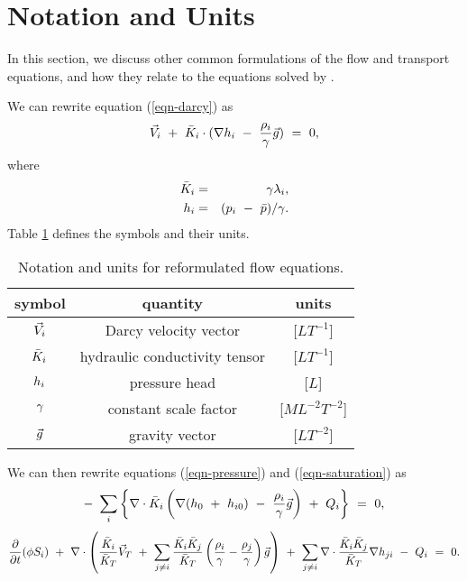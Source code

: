 \section{Notation and Units}
\label{Notation and Units}

In this section, we discuss other common formulations of the flow
and transport equations, and how they relate to the equations solved
by \parflow{}.

We can rewrite equation (\ref{eqn-darcy}) as
\begin{equation} \label{eqn-darcy-b}
{\vec V}_i ~+~ {\bar K}_i \cdot ( \nabla h_i ~-~ \frac{\rho_i}{\gamma} {\vec g} ) ~=~ 0 ,
\end{equation}
where
\begin{eqnarray} \label{eqn-cond-phead}
{\bar K}_i & = & \gamma {\lambda}_i , \\
h_i & = & ( p_i ~-~ \bar{p} ) / \gamma .
\end{eqnarray}
Table \ref{table-flow-units-b} defines the symbols and their units.
\begin{table} \center
\caption{Notation and units for reformulated flow equations.}
\smallskip
\begin{tabular}{||c||c|c||}
\hline
symbol & quantity & units \\
\hline\hline
${\vec V}_i$      & Darcy velocity vector         & [$L T^{-1}$]        \\ \hline
${\bar K}_i$      & hydraulic conductivity tensor & [$L T^{-1}$]        \\ \hline
$h_i$      & pressure head                 & [$L$]               \\ \hline
$\gamma$   & constant scale factor         & [$M L^{-2} T^{-2}$] \\ \hline
${\vec g}$       & gravity vector                & [$L T^{-2}$]        \\ \hline
\end{tabular}
\label{table-flow-units-b}
\end{table}
We can then rewrite equations (\ref{eqn-pressure}) and
(\ref{eqn-saturation}) as
\begin{equation} \label{eqn-pressure-b}
-~ \sum_{i}
  \left \{
    \nabla \cdot {\bar K}_i
      \left ( \nabla ( h_0 ~+~ h_{i0} ) ~-~
        \frac{\rho_i}{\gamma} {\vec g} \right )
    ~+~
    Q_i
  \right \}
~=~ 0 ,
\end{equation}
\begin{equation} \label{eqn-saturation-b}
\frac{\partial}{\partial t} ( \phi S_i )
~+~
\nabla \cdot
  \left (
     \frac{{\bar K}_i}{{\bar K}_T} {\vec V}_T ~+~
     \sum_{j \neq i} \frac{{\bar K}_i {\bar K}_j}{{\bar K}_T}
       \left ( \frac{\rho_i}{\gamma} - \frac{\rho_j}{\gamma} \right ) {\vec g}
  \right )
~+~
\sum_{j \neq i} \nabla \cdot
    \frac{{\bar K}_i {\bar K}_j}{{\bar K}_T} \nabla h_{ji}
~-~ Q_i
~=~ 0 .
\end{equation}

